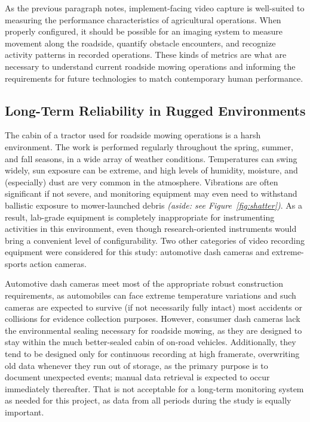 \documentclass[
]{article}
\begin{document}
As the previous paragraph notes, implement-facing video capture is
well-suited to measuring the performance characteristics of agricultural
operations. When properly configured, it should be possible for an
imaging system to measure movement along the roadside, quantify obstacle
encounters, and recognize activity patterns in recorded operations.
These kinds of metrics are what are necessary to understand current
roadside mowing operations and informing the requirements for future
technologies to match contemporary human performance.

\subsection{Long-Term Reliability in Rugged
Environments}\label{sec:rugged_video}

The cabin of a tractor used for roadside mowing operations is a harsh
environment. The work is performed regularly throughout the spring,
summer, and fall seasons, in a wide array of weather conditions.
Temperatures can swing widely, sun exposure can be extreme, and high
levels of humidity, moisture, and (especially) dust are very common in
the atmosphere. Vibrations are often significant if not severe, and
monitoring equipment may even need to withstand ballistic exposure to
mower-launched debris \emph{(aside: see Figure~\ref{fig:shatter})}. As a
result, lab-grade equipment is completely inappropriate for
instrumenting activities in this environment, even though
research-oriented instruments would bring a convenient level of
configurability. Two other categories of video recording equipment were
considered for this study: automotive dash cameras and extreme-sports
action cameras.

Automotive dash cameras meet most of the appropriate robust construction
requirements, as automobiles can face extreme temperature variations and
such cameras are expected to survive (if not necessarily fully intact)
most accidents or collisions for evidence collection purposes. However,
consumer dash cameras lack the environmental sealing necessary for
roadside mowing, as they are designed to stay within the much
better-sealed cabin of on-road vehicles. Additionally, they tend to be
designed only for continuous recording at high framerate, overwriting
old data whenever they run out of storage, as the primary purpose is to
document unexpected events; manual data retrieval is expected to occur
immediately thereafter. That is not acceptable for a long-term
monitoring system as needed for this project, as data from all periods
during the study is equally important.
\end{document}
